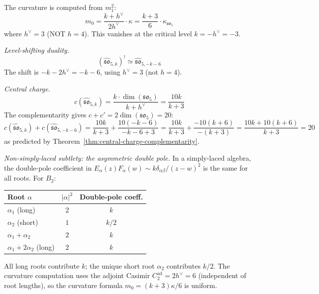 \begin{computation}
\label{comp:so5-curvature}

The curvature is computed from $m_1^2$:
\begin{equation}
m_0 = \frac{k + h^\vee}{2h^\vee} \cdot \kappa
= \frac{k + 3}{6} \cdot \kappa_{\mathfrak{so}_5}
\end{equation}
where $h^\vee = 3$ (NOT $h = 4$).  This vanishes at the critical level
$k = -h^\vee = -3$.

\emph{Level-shifting duality.}
\begin{equation}\label{eq:so5-level-shift}
(\widehat{\mathfrak{so}}_{5,k})^! \simeq \widehat{\mathfrak{so}}_{5,-k-6}
\end{equation}
The shift is $-k - 2h^\vee = -k - 6$, using $h^\vee = 3$ (not $h = 4$).

\emph{Central charge.}
\begin{equation}
c(\widehat{\mathfrak{so}}_{5,k}) = \frac{k \cdot \dim(\mathfrak{so}_5)}{k + h^\vee}
= \frac{10k}{k + 3}
\end{equation}
The complementarity gives $c + c' = 2\dim(\mathfrak{so}_5) = 20$:
\begin{equation}
c(\widehat{\mathfrak{so}}_{5,k}) + c(\widehat{\mathfrak{so}}_{5,-k-6})
= \frac{10k}{k+3} + \frac{10(-k-6)}{-k-6+3}
= \frac{10k}{k+3} + \frac{-10(k+6)}{-(k+3)}
= \frac{10k + 10(k+6)}{k+3} = 20
\end{equation}
as predicted by Theorem~\ref{thm:central-charge-complementarity}.

\emph{Non-simply-laced subtlety: the asymmetric double pole.}
In a simply-laced algebra, the double-pole coefficient in
$E_\alpha(z) F_\alpha(w) \sim k\delta_{\alpha\beta}/(z-w)^2$
is the same for all roots.  For $B_2$:
\begin{center}
\renewcommand{\arraystretch}{1.2}
\begin{tabular}{lcc}
\textbf{Root $\alpha$} & \textbf{$|\alpha|^2$} & \textbf{Double-pole coeff.} \\
\hline
$\alpha_1$ (long) & $2$ & $k$ \\
$\alpha_2$ (short) & $1$ & $k/2$ \\
$\alpha_1+\alpha_2$ & $2$ & $k$ \\
$\alpha_1+2\alpha_2$ (long) & $2$ & $k$
\end{tabular}
\end{center}
All long roots contribute $k$; the unique short root $\alpha_2$
contributes $k/2$.  The curvature computation uses the adjoint
Casimir $C_2^{\mathrm{ad}} = 2h^\vee = 6$ (independent of root lengths),
so the curvature formula $m_0 = (k+3)\kappa/6$ is uniform.
\end{computation}

